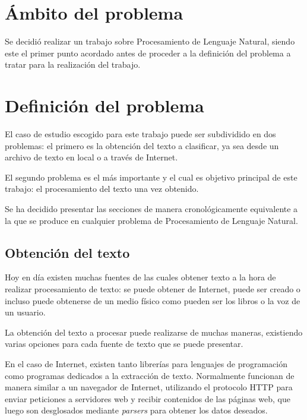 \lhead{\emph{\ChapterOne{}}}
\section{Ámbito del problema}

Se decidió realizar un trabajo sobre Procesamiento de Lenguaje Natural, siendo este el primer punto acordado antes de proceder a la definición del problema a tratar para la realización del trabajo.

\section{Definición del problema}

El caso de estudio escogido para este trabajo puede ser subdividido en dos problemas: el primero es la obtención del texto a clasificar, ya sea desde un archivo de texto en local o a través de Internet.

El segundo problema es el más importante y el cual es objetivo principal de este trabajo: el procesamiento del texto una vez obtenido.

Se ha decidido presentar las secciones de manera cronológicamente equivalente a la que se produce en cualquier problema de Procesamiento de Lenguaje Natural.



\subsection{Obtención del texto}

Hoy en día existen muchas fuentes de las cuales obtener texto a la hora de realizar procesamiento de texto: se puede obtener de Internet, puede ser creado o incluso puede obtenerse de un medio físico como pueden ser los libros o la voz de un usuario.

La obtención del texto a procesar puede realizarse de muchas maneras, existiendo varias opciones para cada fuente de texto que se puede presentar. 

En el caso de Internet, existen tanto librerías para lenguajes de programación como programas dedicados a la extracción de texto. Normalmente funcionan de manera similar a un navegador de Internet, utilizando el protocolo HTTP para enviar peticiones a servidores web y recibir contenidos de las páginas web, que luego son desglosados mediante \textit{parsers} para obtener los datos deseados.

